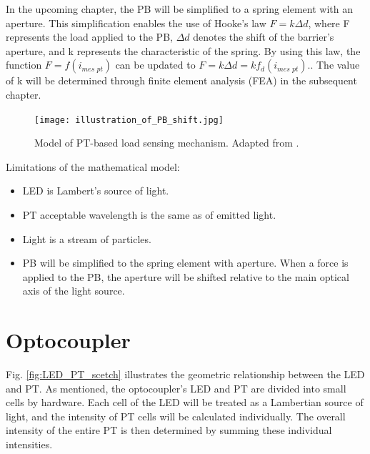 In the upcoming chapter, the PB will be simplified to a spring element with an aperture. 
This simplification enables the use of Hooke's law $F = k\Delta d$, where F represents the load applied 
to the PB, $\Delta d$ denotes the shift of the barrier's aperture, and k represents the 
characteristic of the spring. 
By using this law, the function $F = f(i_{\textit{mes pt}})$ can be updated to $F = k \Delta d = k f_d(i_{\textit{mes pt}})$..
The value of k will be determined through finite element analysis (FEA) in the subsequent chapter. 

\begin{figure}[H]
  \centering
  \texttt{[image: illustration\_of\_PB\_shift.jpg]}
  \caption{Model of PT-based load sensing mechanism. Adapted from \cite[Fig. 1]{my_love_pressure_photosensor}.}
  \label{fig:load_pt_based_mechanism}
  \end{figure}

Limitations of the mathematical model:
\begin{itemize}
    \item LED is Lambert's source of light.
    \item PT acceptable wavelength is the same as of emitted light.
    \item Light is a stream of particles.
    \item PB will be simplified to the spring element with aperture. When a force is applied to the PB, the aperture will be shifted relative to the main optical axis of the light source.
\end{itemize}

\section{Optocoupler}
Fig. \ref{fig:LED_PT_scetch} illustrates the geometric relationship between the LED and PT. 
As mentioned, the optocoupler's LED and PT are divided into small cells by hardware.
 Each cell of the LED will be treated as a Lambertian source of light, and the intensity 
 of PT cells will be calculated individually. 
 The overall intensity of the entire PT is then determined by summing these individual intensities. 

